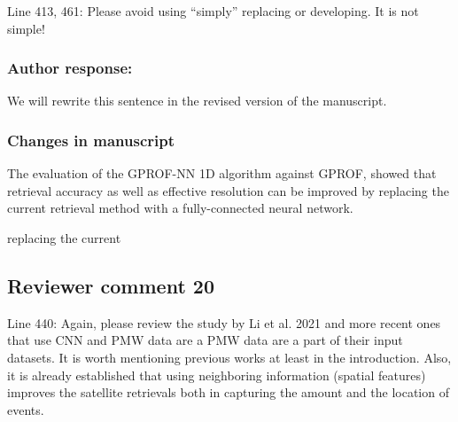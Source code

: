 Line 413, 461: Please avoid using “simply” replacing or developing. It is not simple!

\subsubsection*{Author response:}

We will rewrite this sentence in the revised version of the manuscript.

\subsubsection*{Changes in manuscript}

\begin{change}[461]
  The evaluation of the GPROF-NN 1D algorithm against GPROF, showed that retrieval
  accuracy as well as effective resolution can be improved \DIFdelbegin {}\DIFdelend by replacing the
  current retrieval method with a fully-connected neural network.
\end{change}

\begin{change}[522]

    \DIFdelbegin {}\DIFdelend
    \DIFaddbegin {}\DIFaddend replacing the current
    \DIFdelbegin {}\DIFdelend \DIFaddbegin {}\DIFaddend

\end{change}



\subsection*{Reviewer comment 20}

Line 440: Again, please review the study by Li et al. 2021 and more recent ones
that use CNN and PMW data are a PMW data are a part of their input datasets. It
is worth mentioning previous works at least in the introduction. Also, it is
already established that using neighboring information (spatial features)
improves the satellite retrievals both in capturing the amount and the location
of events.

